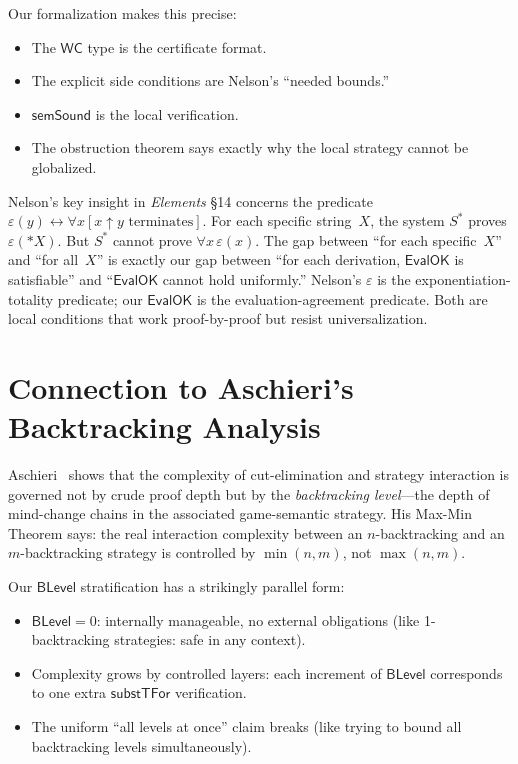 \documentclass[11pt]{article}
\newcommand{\WC}{\mathsf{WC}}
\newcommand{\EvalOK}{\mathsf{EvalOK}}
\newcommand{\substTFor}{\mathsf{substTFor}}
\newcommand{\BLevel}{\mathsf{BLevel}}
\begin{document}
Our formalization makes this precise:
\begin{itemize}
\item The $\WC$ type is the certificate format.
\item The explicit side conditions are Nelson's ``needed bounds.''
\item $\mathsf{semSound}$ is the local verification.
\item The obstruction theorem says exactly why the local strategy
  cannot be globalized.
\end{itemize}

Nelson's key insight in \emph{Elements} \S14 concerns the predicate
$\varepsilon(y) \leftrightarrow \forall x[x \uparrow y \text{ terminates}]$.
For each specific string~$X$, the system $S^*$ proves $\varepsilon(*X)$.
But $S^*$ cannot prove $\forall x\,\varepsilon(x)$.
The gap between ``for each specific~$X$'' and ``for all~$X$''
is exactly our gap between ``for each derivation, $\EvalOK$ is
satisfiable'' and ``$\EvalOK$ cannot hold uniformly.''
Nelson's $\varepsilon$ is the exponentiation-totality predicate;
our $\EvalOK$ is the evaluation-agreement predicate.
Both are local conditions that work proof-by-proof but resist universalization.

\section{Connection to Aschieri's Backtracking Analysis}

Aschieri~\cite{aschieri2016} shows that the complexity of
cut-elimination and strategy interaction is governed not by crude
proof depth but by the \emph{backtracking level}---the depth of
mind-change chains in the associated game-semantic strategy.
His Max-Min Theorem says: the real interaction complexity between
an $n$-backtracking and an $m$-backtracking strategy is controlled
by $\min(n,m)$, not $\max(n,m)$.

Our $\BLevel$ stratification has a strikingly parallel form:
\begin{itemize}
\item $\BLevel = 0$: internally manageable, no external obligations
  (like 1-backtracking strategies: safe in any context).
\item Complexity grows by controlled layers: each increment of
  $\BLevel$ corresponds to one extra $\substTFor$ verification.
\item The uniform ``all levels at once'' claim breaks
  (like trying to bound all backtracking levels simultaneously).
\end{itemize}
\end{document}
